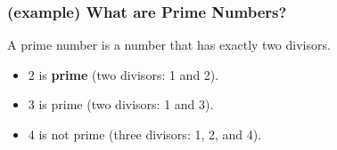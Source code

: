 \documentclass[aspectratio=169]{beamer}
\begin{document}

\begin{frame}
    \frametitle{(example) What are Prime Numbers?}
    
    \begin{definition}
        A \alert{prime number} is a number that has exactly two divisors.
    \end{definition}

    \begin{example}
        \begin{itemize}
            \item 2 is \textbf{prime} (two divisors: 1 and 2).
            \item 3 is prime (two divisors: 1 and 3).
            \item 4 is not prime (\alert{three} divisors: 1, 2, and 4).
        \end{itemize}
    \end{example}

\end{frame}

\end{document}
